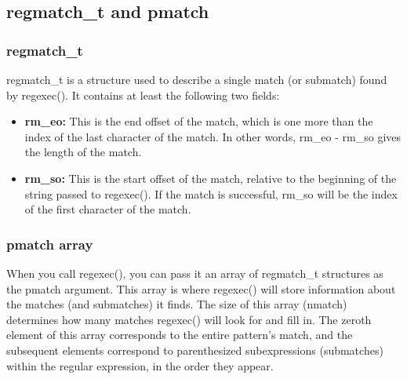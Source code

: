 \documentclass{report}
\begin{document}
    \pagebreak 
    \subsection{regmatch\_t and pmatch}
    \bigbreak \noindent 
    \subsubsection{regmatch\_t}
    \bigbreak \noindent 
    regmatch\_t is a structure used to describe a single match (or submatch) found by regexec(). It contains at least the following two fields:
    \begin{itemize}
        \item \textbf{rm\_eo:} This is the end offset of the match, which is one more than the index of the last character of the match. In other words, rm\_eo - rm\_so gives the length of the match.
        \item \textbf{rm\_so:} This is the start offset of the match, relative to the beginning of the string passed to regexec(). If the match is successful, rm\_so will be the index of the first character of the match.
    \end{itemize}
    \pagebreak 
    \subsubsection{pmatch array}
    \bigbreak \noindent 
    When you call regexec(), you can pass it an array of regmatch\_t structures as the pmatch argument. This array is where regexec() will store information about the matches (and submatches) it finds. The size of this array (nmatch) determines how many matches regexec() will look for and fill in. The zeroth element of this array corresponds to the entire pattern's match, and the subsequent elements correspond to parenthesized subexpressions (submatches) within the regular expression, in the order they appear.

    \bigbreak \noindent 
\end{document}
